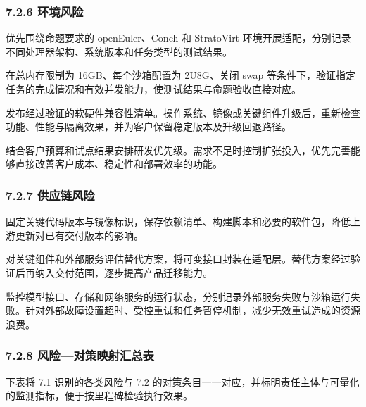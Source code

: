\subsubsection{7.2.6 环境风险}\label{ux73afux5883ux98ceux9669-1}


优先围绕命题要求的 openEuler、Conch 和 StratoVirt 环境开展适配，分别记录不同处理器架构、系统版本和任务类型的测试结果。

在总内存限制为 16GB、每个沙箱配置为 2U8G、关闭 swap 等条件下，验证指定任务的完成情况和有效并发能力，使测试结果与命题验收直接对应。


发布经过验证的软硬件兼容性清单。操作系统、镜像或关键组件升级后，重新检查功能、性能与隔离效果，并为客户保留稳定版本及升级回退路径。


结合客户预算和试点结果安排研发优先级。需求不足时控制扩张投入，优先完善能够直接改善客户成本、稳定性和部署效率的功能。

\subsubsection{7.2.7 供应链风险}\label{ux4f9bux5e94ux94feux98ceux9669-1}


固定关键代码版本与镜像标识，保存依赖清单、构建脚本和必要的软件包，降低上游更新对已有交付版本的影响。


对关键组件和外部服务评估替代方案，将可变接口封装在适配层。替代方案经过验证后再纳入交付范围，逐步提高产品迁移能力。


监控模型接口、存储和网络服务的运行状态，分别记录外部服务失败与沙箱运行失败。针对外部故障设置超时、受控重试和任务暂停机制，减少无效重试造成的资源浪费。

\subsubsection{7.2.8 风险---对策映射汇总表}\label{ux98ceux9669ux5bf9ux7b56ux6620ux5c04ux6c47ux603bux8868}

下表将 7.1 识别的各类风险与 7.2 的对策条目一一对应，并标明责任主体与可量化的监测指标，便于按里程碑检验执行效果。

